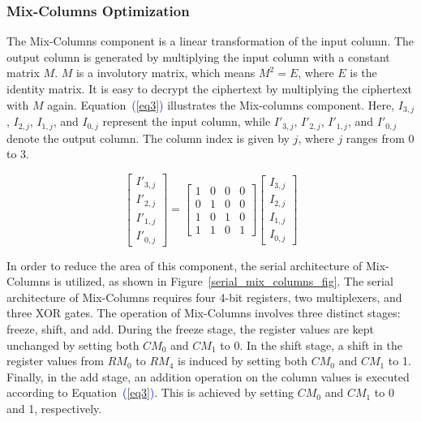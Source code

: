 \documentclass[final,5p,times,twocolumn]{elsarticle}
\begin{document}
\subsubsection{Mix-Columns Optimization}\label{subsubsec2}

The Mix-Columns component is a linear transformation of the input column.
The output column is generated by multiplying the input column with a constant matrix $M$.
$M$ is a involutory matrix, which means $M^2 = E$, where $E$ is the identity matrix.
It is easy to decrypt the ciphertext by multiplying the ciphertext with $M$ again.
Equation~\textcolor{blue}{(\ref{eq3})} illustrates the Mix-columns component.
Here, $I_{3,j}$, $I_{2,j}$, $I_{1,j}$, and $I_{0,j}$ represent the input column, while $I'_{3,j}$, $I'_{2,j}$, $I'_{1,j}$, and $I'_{0,j}$ denote the output column.
The column index is given by $j$, where $j$ ranges from 0 to 3.

\begin{equation}
    \begin{bmatrix}
        I'_{3,j} \\
        I'_{2,j} \\
        I'_{1,j} \\
        I'_{0,j}
    \end{bmatrix}
    =
    \begin{bmatrix}
        1 & 0 & 0 & 0 \\
        0 & 1 & 0 & 0 \\
        1 & 0 & 1 & 0 \\
        1 & 1 & 0 & 1
    \end{bmatrix}
    \begin{bmatrix}
        I_{3,j} \\
        I_{2,j} \\
        I_{1,j} \\
        I_{0,j}
    \end{bmatrix}
    \label{eq3}
\end{equation}


In order to reduce the area of this component, the serial architecture of Mix-Columns is utilized, as shown in Figure~\ref{serial_mix_columns_fig}.
The serial architecture of Mix-Columns requires four 4-bit registers, two multiplexers, and three XOR gates.
The operation of Mix-Columns involves three distinct stages: freeze, shift, and add.
During the freeze stage, the register values are kept unchanged by setting both $CM_0$ and $CM_1$ to 0.
In the shift stage, a shift in the register values from $RM_0$ to $RM_4$ is induced by setting both $CM_0$ and $CM_1$ to 1.
Finally, in the add stage, an addition operation on the column values is executed according to Equation~\textcolor{blue}{(\ref{eq3})}. This is achieved by setting $CM_0$ and $CM_1$ to 0 and 1, respectively.
\end{document}
